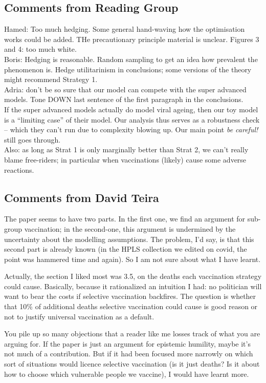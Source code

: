 \documentclass[a4paper,12pt]{article}
\begin{document}
\subsection*{Comments from Reading Group}
Hamed: Too much hedging. Some general hand-waving how the optimisation works could be added. THe precautionary principle material is unclear. Figures 3 and 4: too much white.\\
Boris: Hedging is reasonable. Random sampling to get an idea how prevalent the phenomenon is. Hedge utilitarinism in conclusions; some versions of the theory might recommend Strategy 1.\\
Adria: don't be so sure that our model can compete with the super advanced models. Tone DOWN last sentence of the first paragraph in the conclusions.\\ If the super advanced models actually do model viral ageing, then our toy model is a ``limiting case'' of their model. Our analysis thus serves as a robustness check -- which they can't run due to complexity blowing up. Our main point \emph{be careful!} still goes through.\\
Also: as long as Strat 1 is only marginally better than Strat 2, we can't really blame free-riders; in particular when vaccinations (likely) cause some adverse reactions.

\subsection*{Comments from David Teira}
The paper seems to have two parts. In the first one, we find an argument for sub-group vaccination; in the second-one, this argument is undermined by the uncertainty about the modelling assumptions. The problem, I'd say, is that this second part is already known (in the HPLS collection we edited on covid, the point was hammered time and again). So I am not sure about what I have learnt.

Actually, the section I liked most was 3.5, on the deaths each vaccination strategy could cause. Basically, because it rationalized an intuition I had: no politician will want to bear the costs if selective vaccination backfires. The question is whether that 10\% of additional deaths selective vaccination could cause is  good reason or not to justify universal vaccination as a default.

You pile up so many objections that a reader like me losses track of what you are arguing for. If the paper is just an argument for epistemic humility, maybe it's not much of a contribution. But if it had been focused more narrowly on which sort of situations would licence selective vaccination (is it just deaths? Is it about how to choose which vulnerable people we vaccine), I would have learnt more. 
\end{document}

